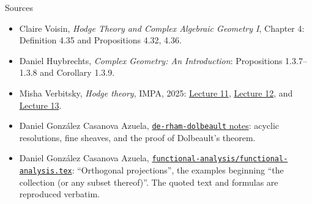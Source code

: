 \documentclass[aspectratio=169,11pt]{beamer}
\begin{document}
\begin{frame}{Sources}
\begin{itemize}
\item Claire Voisin, \emph{Hodge Theory and Complex Algebraic Geometry I},
Chapter 4: Definition 4.35 and Propositions 4.32, 4.36.
\item Daniel Huybrechts, \emph{Complex Geometry: An Introduction}:
Propositions 1.3.7--1.3.8 and Corollary 1.3.9.
\item Misha Verbitsky, \emph{Hodge theory}, IMPA, 2025:
\href{http://verbit.ru/IMPA/Kahler-2025/slides-Kahler-2025-11.pdf}{Lecture 11},
\href{http://verbit.ru/IMPA/Kahler-2025/slides-Kahler-2025-12.pdf}{Lecture 12},
and \href{http://verbit.ru/IMPA/Kahler-2025/slides-Kahler-2025-13.pdf}{Lecture 13}.
\item Daniel Gonz\'alez Casanova Azuela,
\href{https://github.com/danimalabares/tmp/blob/main/de-rham-dolbeault/de-rham-dolbeault.tex}{\texttt{de-rham-dolbeault} notes}: acyclic resolutions,
fine sheaves, and the proof of Dolbeault's theorem.
\item Daniel Gonz\'alez Casanova Azuela,
\href{https://github.com/danimalabares/functional-analysis/blob/main/functional-analysis/functional-analysis.tex}{\texttt{functional-analysis/functional-analysis.tex}}:
``Orthogonal projections'', the examples beginning
``the collection (or any subset thereof)''.
The quoted text and formulas are reproduced verbatim.
\end{itemize}
\end{frame}
\end{document}
